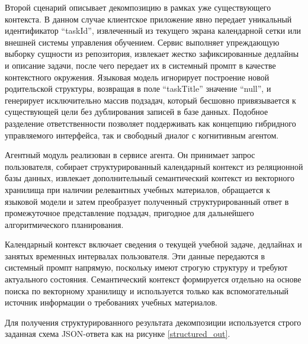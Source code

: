 Второй сценарий описывает декомпозицию в рамках уже существующего контекста. В данном случае клиентское приложение явно передает уникальный идентификатор ``taskId'', извлеченный из текущего экрана календарной сетки или внешней системы управления обучением. Сервис выполняет упреждающую выборку сущности из репозитория, извлекает жестко зафиксированные дедлайны и описание задачи, после чего передает их в системный промпт в качестве контекстного окружения. Языковая модель игнорирует построение новой родительской структуры, возвращая в поле ``taskTitle'' значение ``null'', и генерирует исключительно массив подзадач, который бесшовно привязывается к существующей цели без дублирования записей в базе данных. Подобное разделение ответственности позволяет поддерживать как концепцию гибридного управляемого интерфейса, так и свободный диалог с когнитивным агентом.

\numberedparagraph
Агентный модуль реализован в сервисе агента. Он принимает запрос пользователя, собирает структурированный календарный контекст из реляционной базы данных, извлекает дополнительный семантический контекст из векторного хранилища при наличии релевантных учебных материалов, обращается к языковой модели и затем преобразует полученный структурированный ответ в промежуточное представление подзадач, пригодное для дальнейшего алгоритмического планирования.

Календарный контекст включает сведения о текущей учебной задаче, дедлайнах и занятых временных интервалах пользователя. Эти данные передаются в системный промпт напрямую, поскольку имеют строгую структуру и требуют актуального состояния. Семантический контекст формируется отдельно на основе поиска по векторному хранилищу и используется только как вспомогательный источник информации о требованиях учебных материалов.

Для получения структурированного результата декомпозиции используется строго заданная схема JSON-ответа как на рисунке \ref{structured_out}.

